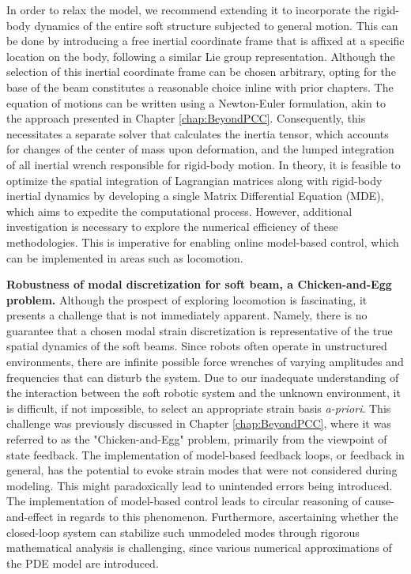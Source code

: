 In order to relax the model, we recommend extending it to incorporate the rigid-body dynamics of the entire soft structure subjected to general motion. This can be done by introducing a free inertial coordinate frame that is affixed at a specific location on the body, following a similar  Lie group representation. Although the selection of this inertial coordinate frame can be chosen arbitrary, opting for the base of the beam constitutes a reasonable choice inline with prior chapters. The equation of motions can be written using a Newton-Euler formulation, akin to the approach presented in Chapter \ref{chap:BeyondPCC}. Consequently, this necessitates a separate solver that calculates the inertia tensor, which accounts for changes of the center of mass upon deformation, and the lumped integration of all inertial wrench responsible for rigid-body motion. In theory, it is feasible to optimize the spatial integration of Lagrangian matrices along with rigid-body inertial dynamics by developing a single Matrix Differential Equation (MDE), which aims to expedite the computational process. However, additional investigation is necessary to explore the numerical efficiency of these methodologies. This is imperative for enabling online model-based control, which can be implemented in areas such as locomotion. \vspace{1mm}

\textbf{Robustness of modal discretization for soft beam, a Chicken-and-Egg problem.} Although the prospect of exploring locomotion is fascinating, it presents a challenge that is not immediately apparent. Namely, there is no guarantee that a chosen modal strain discretization is representative of the true spatial dynamics of the soft beams. Since robots often operate in unstructured environments, there are infinite possible force wrenches of varying amplitudes and frequencies that can disturb the system. Due to our inadequate understanding of the interaction between the soft robotic system and the unknown environment, it is difficult, if not impossible, to select an appropriate strain basis \textit{a-priori}. This challenge was previously discussed in Chapter \ref{chap:BeyondPCC}, where it was referred to as the "Chicken-and-Egg" problem, primarily from the viewpoint of state feedback. The implementation of model-based feedback loops, or feedback in general, has the potential to evoke strain modes that were not considered during modeling. This might paradoxically lead to unintended errors being introduced. The implementation of model-based control leads to circular reasoning of cause-and-effect in regards to this phenomenon. Furthermore, ascertaining whether the closed-loop system can stabilize such unmodeled modes through rigorous mathematical analysis is challenging, since various numerical approximations of the PDE model are introduced.

